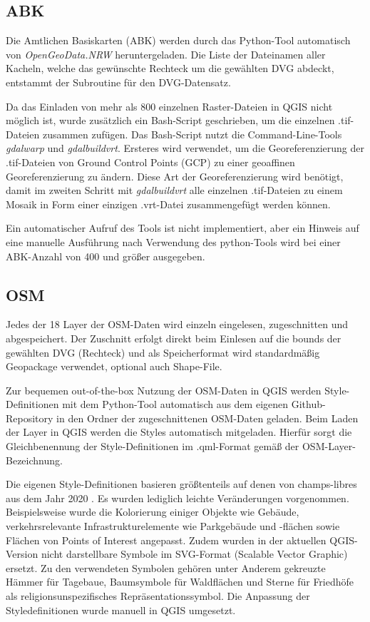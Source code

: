 
		\subsection{ABK}
			Die Amtlichen Basiskarten (ABK) werden durch das Python-Tool automatisch von \textit{OpenGeoData.NRW} heruntergeladen. Die Liste der Dateinamen aller Kacheln, welche das gewünschte Rechteck um die gewählten DVG abdeckt, entstammt der Subroutine für den DVG-Datensatz. 
			
			Da das Einladen von mehr als 800 einzelnen Raster-Dateien in QGIS nicht möglich ist, wurde zusätzlich ein Bash-Script geschrieben, um die einzelnen .tif-Dateien zusammen zufügen. Das Bash-Script nutzt die Command-Line-Tools \textit{gdalwarp} und \textit{gdalbuildvrt}. Ersteres wird verwendet, um die Georeferenzierung der .tif-Dateien von Ground Control Points (GCP) zu einer geoaffinen Georeferenzierung zu ändern. Diese Art der Georeferenzierung wird benötigt, damit im zweiten Schritt mit \textit{gdalbuildvrt} alle einzelnen .tif-Dateien zu einem Mosaik in Form einer einzigen .vrt-Datei zusammengefügt werden können. 
			
			Ein automatischer Aufruf des Tools ist nicht implementiert, aber ein Hinweis auf eine manuelle Ausführung nach Verwendung des python-Tools wird bei einer ABK-Anzahl von 400 und größer ausgegeben.
			
			
		\subsection{OSM}
			Jedes der 18 Layer der OSM-Daten wird einzeln eingelesen, zugeschnitten und abgespeichert. Der Zuschnitt erfolgt direkt beim Einlesen auf die bounds der gewählten DVG (Rechteck) und als Speicherformat wird standardmäßig Geopackage verwendet, optional auch Shape-File. 
			
			Zur bequemen out-of-the-box Nutzung der OSM-Daten in QGIS werden Style-Definitionen mit dem Python-Tool automatisch aus dem eigenen Github-Repository in den Ordner der zugeschnittenen OSM-Daten geladen. Beim Laden der Layer in QGIS werden die Styles automatisch mitgeladen. Hierfür sorgt die Gleichbenennung der Style-Definitionen im .qml-Format gemäß der OSM-Layer-Bezeichnung. \cite{web_github_repo_code}
						
			Die eigenen Style-Definitionen basieren größtenteils auf denen von champs-libres aus dem Jahr 2020 \cite{web_gitlab_champs_libres}. Es wurden lediglich leichte Veränderungen vorgenommen. Beispielsweise wurde die Kolorierung einiger Objekte wie Gebäude, verkehrsrelevante Infrastrukturelemente wie Parkgebäude und -flächen sowie Flächen von Points of Interest angepasst. Zudem wurden in der aktuellen QGIS-Version nicht darstellbare Symbole im SVG-Format (Scalable Vector Graphic) ersetzt. Zu den verwendeten Symbolen gehören unter Anderem gekreuzte Hämmer für Tagebaue, Baumsymbole für Waldflächen und Sterne für Friedhöfe als religionsunspezifisches Repräsentationssymbol. Die Anpassung der Styledefinitionen wurde manuell in QGIS umgesetzt. 
			
